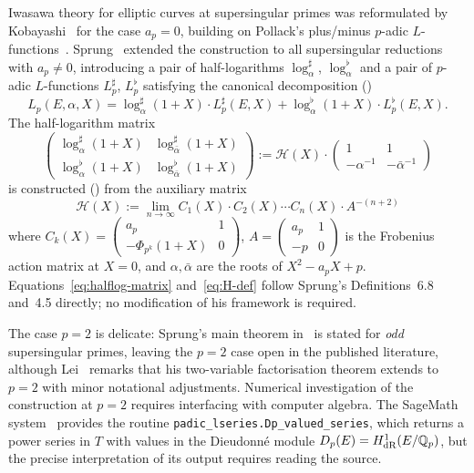 \documentclass[11pt,a4paper]{amsart}
\theoremstyle{definition}
\newcommand{\Qp}{\mathbb{Q}_p}
\newcommand{\Hcal}{\mathcal{H}}
\begin{document}
Iwasawa theory for elliptic curves at supersingular primes was reformulated by Kobayashi~\cite{Kobayashi2003} for the case $a_p = 0$, building on Pollack's plus/minus $p$-adic $L$-functions~\cite{Pollack2003}. Sprung~\cite{Sprung2012} extended the construction to all supersingular reductions with $a_p \neq 0$, introducing a pair of half-logarithms $\log_\alpha^\sharp$, $\log_\alpha^\flat$ and a pair of $p$-adic $L$-functions $L_p^\sharp$, $L_p^\flat$ satisfying the canonical decomposition (\cite[Theorem~6.12]{Sprung2012})
\begin{equation}\label{eq:sprung-main}
L_p(E, \alpha, X) = \log_\alpha^\sharp(1+X) \cdot L_p^\sharp(E, X) + \log_\alpha^\flat(1+X) \cdot L_p^\flat(E, X).
\end{equation}
The half-logarithm matrix
\begin{equation}\label{eq:halflog-matrix}
\begin{pmatrix} \log_\alpha^\sharp(1+X) & \log_{\bar\alpha}^\sharp(1+X) \\ \log_\alpha^\flat(1+X) & \log_{\bar\alpha}^\flat(1+X) \end{pmatrix} := \Hcal(X) \cdot \begin{pmatrix} 1 & 1 \\ -\alpha^{-1} & -\bar\alpha^{-1} \end{pmatrix}
\end{equation}
is constructed (\cite[Definition~6.8]{Sprung2012}) from the auxiliary matrix
\begin{equation}\label{eq:H-def}
\Hcal(X) := \lim_{n \to \infty} C_1(X) \cdot C_2(X) \cdots C_n(X) \cdot A^{-(n+2)}
\end{equation}
where $C_k(X) = \begin{pmatrix} a_p & 1 \\ -\Phi_{p^k}(1+X) & 0 \end{pmatrix}$, $A = \begin{pmatrix} a_p & 1 \\ -p & 0 \end{pmatrix}$ is the Frobenius action matrix at $X=0$, and $\alpha, \bar\alpha$ are the roots of $X^2 - a_p X + p$. Equations~\eqref{eq:halflog-matrix} and~\eqref{eq:H-def} follow Sprung's Definitions~6.8 and~4.5 directly; no modification of his framework is required.

The case $p = 2$ is delicate: Sprung's main theorem in~\cite{Sprung2016} is stated for \emph{odd} supersingular primes, leaving the $p = 2$ case open in the published literature, although Lei~\cite{Lei2013} remarks that his two-variable factorisation theorem extends to $p = 2$ with minor notational adjustments. Numerical investigation of the construction at $p = 2$ requires interfacing with computer algebra. The SageMath system~\cite{Sage} provides the routine \texttt{padic\_lseries.Dp\_valued\_series}, which returns a power series in $T$ with values in the Dieudonn\'e module $D_p(E) = H^1_{\rm dR}(E/\Qp)$, but the precise interpretation of its output requires reading the source.
\end{document}
